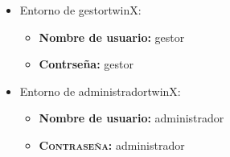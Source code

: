 \begin{itemize}
	\item Entorno de \gls{gestortwinX}:
	\begin{itemize}
		\item \textbf{Nombre de usuario:} gestor
		\item \textbf{Contrseña:} gestor	
	\end{itemize}
	\item Entorno de \gls{administradortwinX}:
	\begin{itemize}
		\item \textbf{Nombre de usuario:} administrador
		\item \textbf{\textsc{Contraseña}:} administrador	
	\end{itemize}
\end{itemize}


